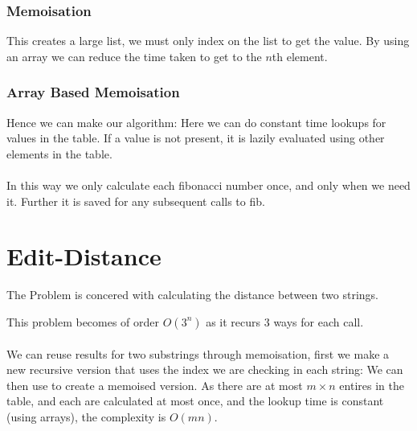 \documentclass{report}
\begin{document}
        \subsubsection*{Memoisation}
            This creates a large list, we must only index on the list to get the value.
            By using an array we can reduce the time taken to get to the $n$th element.
        \subsubsection*{Array Based Memoisation}    
            Hence we can make our algorithm:
            Here we can do constant time lookups for values in the table. If a value is not present, it is lazily evaluated using other elements in the table.
            \\
            \\ In this way we only calculate each fibonacci number once, and only when we need it. Further it is saved for any subsequent calls to fib.

     \section*{Edit-Distance}
        The  Problem is concered with calculating the  distance between two strings.
        
        This problem becomes of order $O(3^n)$ as it recurs 3 ways for each call.
        \\
        \\ We can reuse results for two substrings through memoisation, first we make a new recursive version that uses the index we are checking in each string:
        We can then use  to create a memoised version.
        As there are at most $m \times n$ entires in the table, and each are calculated at most once, and the lookup time is constant (using arrays), the complexity is $O(mn)$.
\end{document}
